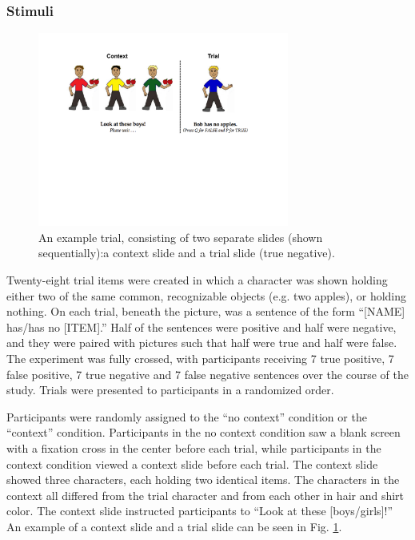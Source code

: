 \documentclass[10pt,letterpaper]{article}
\begin{document}
\subsubsection{Stimuli}

\begin{figure}[t]
\begin{center} 
\includegraphics[width=3.25in]{figures/negatron_trialfig2.pdf}
\caption{\label{fig:trial} An example trial, consisting of two separate slides (shown sequentially):a context slide and a trial slide (true negative). }
\vspace{-5mm}
\end{center} 
\end{figure}

Twenty-eight trial items were created in which a character was shown holding either two of the same common, recognizable objects (e.g. two apples), or holding nothing.  On each trial, beneath the picture, was a sentence of the form ``[NAME] has/has no [ITEM].''  Half of the sentences were positive and half were negative, and they were paired with pictures such that half were true and half were false.  The experiment was fully crossed, with participants receiving 7 true positive, 7 false positive, 7 true negative and 7 false negative sentences over the course of the study.  Trials were presented to participants in a randomized order.  

Participants were randomly assigned to the ``no context'' condition or the ``context'' condition.  Participants in the no context condition saw a blank screen with a fixation cross in the center before each trial, while participants in the context condition viewed a context slide before each trial.  The context slide showed three characters, each holding two identical items.  The characters in the context all differed from the trial character and from each other in hair and shirt color.  The context slide instructed participants to ``Look at these [boys/girls]!''  An example of a context slide and a trial slide can be seen in Fig. \ref{fig:trial}.  
\end{document}
